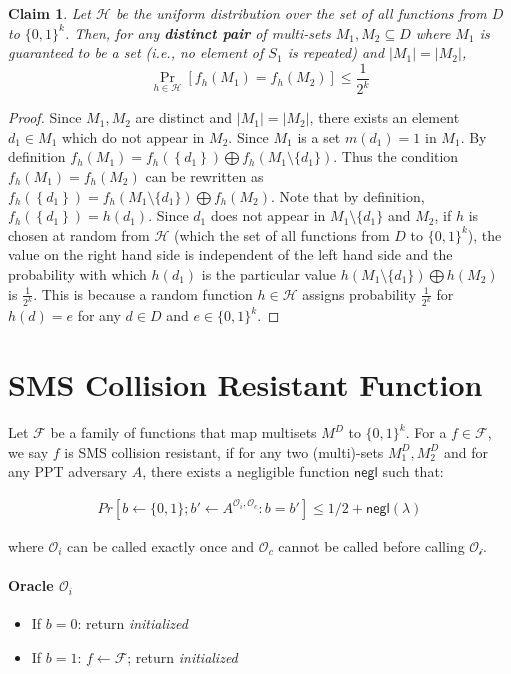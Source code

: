 \documentclass{article}
\newtheorem{claim}{Claim}
\newcommand{\hashFamily}{\mathcal{H}}
\newcommand{\funcfamily}{\mathcal{F}}
\newcommand{\XOR}{\bigoplus}
\newcommand{\set}[1]{\left\{ #1 \right\}}
\begin{document}
 \begin{claim}
 Let $\hashFamily$ be the uniform distribution over the set of all functions from $D$ to $\{0,1\}^k$. Then, for any \textbf{distinct pair} of multi-sets $M_1,M_2 \subseteq D$ where $M_1$ is guaranteed to be a set (i.e., no element of $S_1$ is repeated) and $|M_1|=|M_2|$,
  \[
\Pr_{h \in \hashFamily} [f_h(M_1) = f_h(M_2) ] \leq \frac{1}{2^k}
 \]
 \end{claim}\label{claim:randomfunc}
 \begin{proof}
 Since $M_1,M_2$ are distinct and $|M_1| = |M_2|$, there exists an element $d_1 \in M_1$ which do not appear in $M_2$. Since $M_1$ is a set $m(d_1)=1$ in $M_1$. By definition $f_h(M_1)=f_h(\set{d_1}) \XOR f_h(M_1\setminus \{d_1\})$. Thus the condition $f_h(M_1)=f_h(M_2)$ can be rewritten as $f_h(\set{d_1}) = f_h(M_1\setminus \{d_1\}) \XOR f_h(M_2)$.
Note that by definition, $f_h(\set{d_1})=h(d_1)$.
 Since $d_1$ does not appear in $M_1\setminus \{d_1\}$ and $M_2$, if $h$ is chosen at random from $\hashFamily$ (which the set of all functions from $D$ to $\{0,1\}^k$), the value on the right hand side is independent of the left hand side and the probability with which $h(d_1)$ is the particular value $h(M_1\setminus \{d_1\}) \XOR h(M_2)$ is $\frac{1}{2^k}$. This is because a random function $h\in \hashFamily$ assigns probability $\frac{1}{2^k}$ for $h(d)=e$ for any $d\in D$ and $e \in \{0,1\}^k$. 
 \end{proof}

\section{SMS Collision Resistant Function}

Let $\funcfamily$ be a family of functions that map multisets $M^D$ to $\{0,1\}^k$. For a $f \in \funcfamily$, we say $f$ is SMS collision resistant, if for any two (multi)-sets $M^D_1,M^D_2$ and for any PPT adversary $A$, there exists a negligible function $\mathsf{negl}$ such that:

\begin{align*}
    Pr [b \leftarrow \{0,1\}; b' \leftarrow A^{\mathcal{O}_i,\mathcal{O}_c}: b=b'] \leq 1/2 + \mathsf{negl}(\lambda)
\end{align*}

where $\mathcal{O}_i$ can be called exactly once and $\mathcal{O}_c$ cannot be called before calling $\mathcal{O_i}$.

\paragraph{Oracle $\mathcal{O}_i$}
\begin{itemize}
    \item If $b=0$: return \emph{initialized}
    \item If $b=1$: $f \leftarrow \funcfamily$; return \emph{initialized}
\end{itemize}
\end{document}
